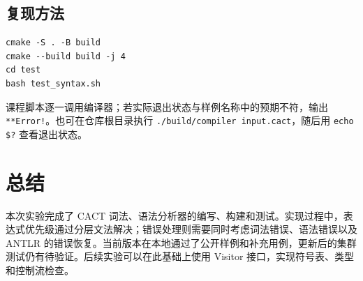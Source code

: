 \documentclass[UTF8,a4paper,11pt]{ctexart}
\begin{document}
\subsection{复现方法}
\begin{lstlisting}
cmake -S . -B build
cmake --build build -j 4
cd test
bash test_syntax.sh
\end{lstlisting}
课程脚本逐一调用编译器；若实际退出状态与样例名称中的预期不符，输出 \texttt{**Error!}。也可在仓库根目录执行 \texttt{./build/compiler input.cact}，随后用 \texttt{echo \$?} 查看退出状态。

\section{总结}
本次实验完成了 CACT 词法、语法分析器的编写、构建和测试。实现过程中，表达式优先级通过分层文法解决；错误处理则需要同时考虑词法错误、语法错误以及 ANTLR 的错误恢复。当前版本在本地通过了公开样例和补充用例，更新后的集群测试仍有待验证。后续实验可以在此基础上使用 Visitor 接口，实现符号表、类型和控制流检查。
\end{document}

